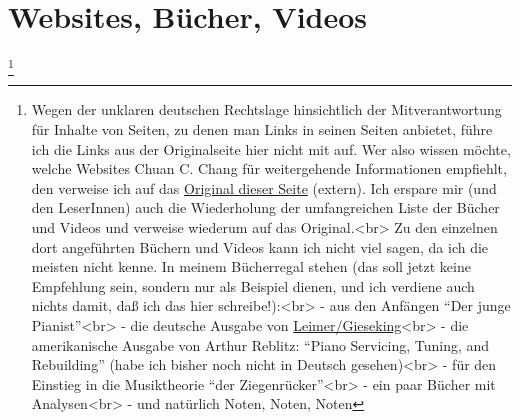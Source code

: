 \chapter{Websites, Bücher, Videos}
\label{Websites}

\footnote{Wegen der unklaren deutschen Rechtslage hinsichtlich der Mitverantwortung für Inhalte von Seiten, zu denen man Links in seinen Seiten anbietet, führe ich die Links aus der Originalseite hier nicht mit auf.
Wer also wissen möchte, welche Websites Chuan C. Chang für weitergehende Informationen empfiehlt, den verweise ich auf das \hyperref[http://www.pianopractice.org]{Original dieser Seite} (extern).
Ich erspare mir (und den LeserInnen) auch die Wiederholung der umfangreichen Liste der Bücher und Videos und verweise wiederum auf das Original.<br>
Zu den einzelnen dort angeführten Büchern und Videos kann ich nicht viel sagen, da ich die meisten nicht kenne.
In meinem Bücherregal stehen (das soll jetzt keine Empfehlung sein, sondern nur als Beispiel dienen, und ich verdiene auch nichts damit, daß ich das hier schreibe!):<br>
- aus den Anfängen \enquote{Der junge Pianist}<br>
- die deutsche Ausgabe von \hyperref[Gieseking]{Leimer/Gieseking}<br>
- die amerikanische Ausgabe von Arthur Reblitz: \enquote{Piano Servicing, Tuning, and Rebuilding} (habe ich bisher noch nicht in Deutsch gesehen)<br>
- für den Einstieg in die Musiktheorie \enquote{der Ziegenrücker}<br>
- ein paar Bücher mit Analysen<br>
- und natürlich Noten, Noten, Noten}
 





